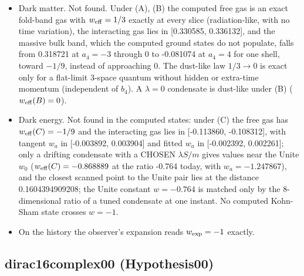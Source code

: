 \documentclass[11pt]{article}
\begin{document}
\begin{itemize}
\item Dark matter. Not found. Under (A), (B) the computed free gas is an exact fold-band gas with $w_{\rm eff} = 1/3$ exactly at every slice (radiation-like, with no time variation), the interacting gas lies in [0.330585, 0.336132], and the massive bulk band, which the computed ground states do not populate, falls from 0.318721 at $a_4 = -3$ through 0 to -0.081074 at $a_4 = 4$ for one shell, toward $-1/9$, instead of approaching 0. The dust-like law $1/3 \to 0$ is exact only for a flat-limit 3-space quantum without hidden or extra-time momentum (independent of $b_4$). A $\lambda = 0$ condensate is dust-like under (B) ($w_{\rm eff}(B) = 0$).
\item Dark energy. Not found in the computed states: under (C) the free gas has $w_{\rm eff}(C) = -1/9$ and the interacting gas lies in [-0.113860, -0.108312], with tangent $w_a$ in [-0.003892, 0.003904] and fitted $w_a$ in [-0.002392, 0.002261]; only a drifting condensate with a CHOSEN $\lambda S/m$ gives values near the Unite $w_0$ ($w_{\rm eff}(C) = -0.868889$ at the ratio -0.764 today, with $w_a = -1.247867$), and the closest scanned point to the Unite pair lies at the distance 0.1604394909208; the Unite constant $w = -0.764$ is matched only by the 8-dimensional ratio of a tuned condensate at one instant. No computed Kohn-Sham state crosses $w = -1$.
\item On the history the observer's expansion reads $w_{\rm exp} = -1$ exactly.
\end{itemize}

\subsection{dirac16complex00 (Hypothesis00)}
\end{document}
